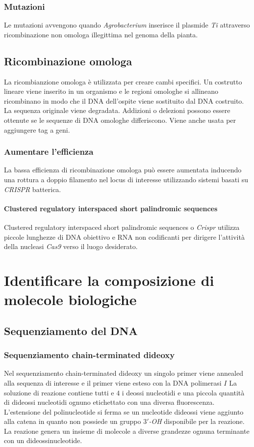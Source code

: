 		\subsubsection{Mutazioni}
		Le mutazioni avvengono quando \emph{Agrobacterium} inserisce il plasmide \emph{Ti} attraverso ricombinazione non omologa illegittima nel genoma della pianta.

	\subsection{Ricombinazione omologa}
	La ricombianzione omologa \`e utilizzata per creare cambi specifici.
	Un costrutto lineare viene inserito in un organismo e le regioni omologhe si allineano  ricombinano in modo che il DNA dell'ospite viene sostituito dal DNA costruito.
	La sequenza originale viene degradata.
	Addizioni o delezioni possono essere ottenute se le sequenze di DNA omologhe differiscono.
	Viene anche usata per aggiungere tag a geni.

		\subsubsection{Aumentare l'efficienza}
		La bassa efficienza di ricombinazione omologa pu\`o essere aumentata inducendo una rottura a doppio filamento nel locus di interesse utilizzando sistemi basati su \emph{CRISPR} batterica.

			\paragraph{Clustered regulatory interspaced short palindromic sequences}
			Clustered regulatory interspaced short palindromic sequences o \emph{Crispr} utilizza piccole lunghezze di DNA obiettivo e RNA non codificanti per dirigere l'attivit\`a della nucleasi \emph{Cas9} verso il luogo desiderato.

\section{Identificare la composizione di molecole biologiche}

	\subsection{Sequenziamento del DNA}
		
		\subsubsection{Sequenziamento chain-terminated dideoxy}
		Nel sequenziamento chain-terminated dideoxy un singolo primer viene annealed alla sequenza di interesse e il primer viene esteso con la DNA polimerasi $I$
		La soluzione di reazione contiene tutti e $4$ i deossi nucleotidi e una piccola quantit\`a di dideossi nucleotidi ognuno etichettato con una diversa fluorescenza.
		L'estensione del polinucleotide si ferma se un nucleotide dideossi viene aggiunto alla catena in quanto non possiede un gruppo \emph{$3'$-OH} disponibile per la reazione.
		La reazione genera un insieme di molecole a diverse grandezze ognuna terminante con un dideossinucleotide.

